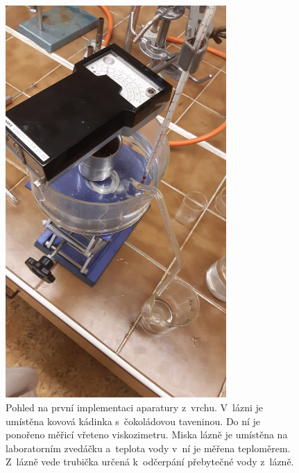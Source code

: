 \documentclass[12pt]{article}
\begin{document}
\begin{figure}
    \centering
    \includegraphics[angle = 270, width = 0.75\textwidth]{prilohy/aparatura_lab_vrch.jpg}
    \caption{Pohled na první implementaci aparatury z~vrchu. V~lázni je umístěna kovová kádinka s~čokoládovou taveninou. Do ní je ponořeno měřicí vřeteno viskozimetru. Miska lázně je umístěna na laboratorním zvedáčku a~teplota vody v~ní je měřena teploměrem. Z~lázně vede trubička určená k~odčerpání přebytečné vody z~lázně.}
    \label{fig:aparatura_lab_bok}
\end{figure}
\end{document}
